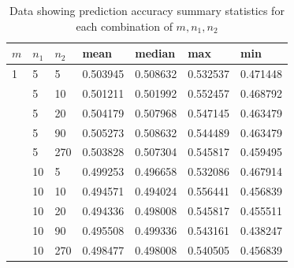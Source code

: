 \documentclass[pageno]{jpaper}
\begin{document}
\footnotesize
\begin{longtable}{p{2cm} p{2cm} p{2cm} p{2cm} p{2cm} p{2cm} p{2cm}}
\caption{Data showing prediction accuracy summary statistics for each combination of $m, n_1, n_2$} \\
\hline
$m$ & $n_1$ & $n_2$ & mean & median & max & min \\
\hline

1 & 5 & 5 & 0.503945 & 0.508632 & 0.532537 & 0.471448 \\

& 5 & 10 & 0.501211 & 0.501992 & 0.552457 & 0.468792 \\

& 5 & 20 & 0.504179 & 0.507968 & 0.547145 & 0.463479 \\

& 5 & 90 & 0.505273 & 0.508632 & 0.544489 & 0.463479 \\

& 5 & 270 & 0.503828 & 0.507304 & 0.545817 & 0.459495 \\

& 10 & 5 & 0.499253 & 0.496658 & 0.532086 & 0.467914 \\

& 10 & 10 & 0.494571 & 0.494024 & 0.556441 & 0.456839 \\

& 10 & 20 & 0.494336 & 0.498008 & 0.545817 & 0.455511 \\

& 10 & 90 & 0.495508 & 0.499336 & 0.543161 & 0.438247 \\

& 10 & 270 & 0.498477 & 0.498008 & 0.540505 & 0.456839 \\


\end{longtable}
\end{document}
